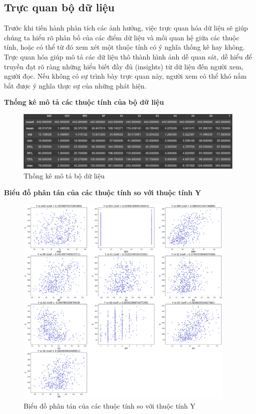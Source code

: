 \documentclass[runningheads]{llncs}
\begin{document}
\subsection{Trực quan bộ dữ liệu}

Trước khi tiến hành phân tích các ảnh hưởng, việc trực quan hóa dữ liệu sẽ giúp chúng ta hiểu rõ phân bố của các điểm dữ liệu và mối quan hệ giữa các thuộc tính, hoặc có thể từ đó xem xét một thuộc tính có ý nghĩa thống kê hay không. Trực quan hóa giúp mô tả các dữ liệu thô thành hình ảnh dễ quan sát, dễ hiểu để truyền đạt rõ ràng những hiểu biết đầy đủ (insights) từ dữ liệu đến người xem, người đọc. Nếu không có sự trình bày trực quan này, người xem có thể khó nắm bắt được ý nghĩa thực sự của những phát hiện.

\pagebreak

\vspace{0.5cm}
\textbf{Thống kê mô tả các thuộc tính của bộ dữ liệu}
\begin{figure}[htb]
\includegraphics[width=1\textwidth]{describe}
\caption{Thống kê mô tả bộ dữ liệu} \label{fig1}
\end{figure}

\textbf{Biểu đồ phân tán của các thuộc tính so với thuộc tính Y}

\begin{figure}[H]
\includegraphics[width=0.955\textwidth]{Scatter_Y}
\caption{Biểu đồ phân tán của các thuộc tính so với thuộc tính Y} \label{fig2}
\end{figure}
\end{document}
